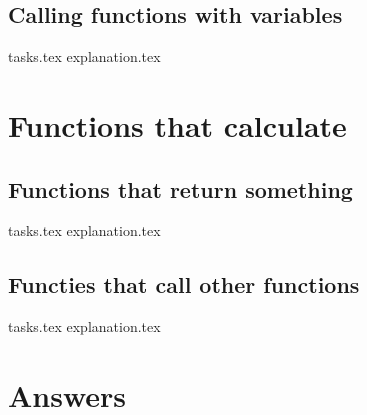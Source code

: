    \section{Calling functions with variables}
    {tasks.tex}         \newpage
    {explanation.tex}      \newpage

    \chapter{Functions that calculate}
    \newpage



    \section{Functions that return something}
    {tasks.tex}            \newpage
    {explanation.tex}         \newpage

    \section{Functies that call other functions}
    {tasks.tex}             \newpage
    {explanation.tex}          \newpage

    \chapter*{Answers}
    \printsolutions[headings-template=collection]


